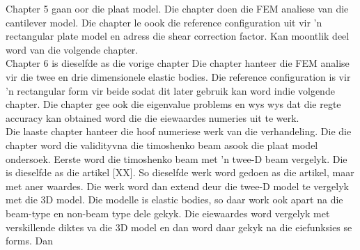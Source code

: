 \documentclass[../main.tex]{subfiles}
\begin{document}
 Chapter 5 gaan oor die plaat model. Die chapter doen die FEM analiese van die cantilever model. Die chapter le oook die reference configuration uit vir 'n rectangular plate model en adress die shear correction factor. Kan moontlik deel word van die volgende chapter.\\
 
 Chapter 6 is dieselfde as die vorige chapter Die chapter hanteer die FEM analise vir die twee en drie dimensionele elastic bodies. Die reference configuration is vir 'n rectangular form vir beide sodat dit later gebruik kan word indie volgende chapter. Die chapter gee ook die eigenvalue problems en wys wys dat die regte accuracy kan obtained word die die eiewaardes numeries uit te werk.\\
 
 Die laaste chapter hanteer die hoof numeriese werk van die verhandeling. Die die chapter word die validityvna die timoshenko beam asook die plaat model ondersoek. Eerste word die timoshenko beam met 'n twee-D beam vergelyk. Die is dieselfde as die artikel [XX]. So dieselfde werk word gedoen as die artikel, maar met aner waardes. Die werk word dan extend deur die twee-D model te vergelyk met die 3D model. Die modelle is elastic bodies, so daar work ook apart na die beam-type en non-beam type dele gekyk. Die eiewaardes word vergelyk met verskillende diktes va die 3D model en dan word daar gekyk na die eiefunksies se forms. Dan 
\end{document}
